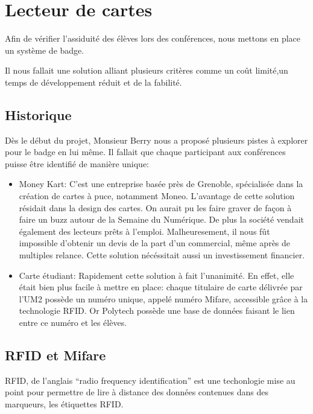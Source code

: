 \chapter{Lecteur de cartes}

Afin de vérifier l'assiduité des élèves lors des conférences, nous mettons en
place un système de badge.

Il nous fallait une solution alliant plusieurs critères comme un coût limité,un temps
de développement réduit et de la fabilité.

    \section{Historique}

Dès le début du projet, Monsieur Berry nous a proposé plusieurs pistes à 
explorer pour le badge en lui même. Il fallait que chaque participant aux
conférences puisse être identifié de manière unique:

\begin{itemize}
\item Money Kart: C'est une entreprise basée près de Grenoble, spécialisée
dans la création de cartes à puce, notamment Moneo. L'avantage de cette solution
résidait dans la design des cartes. On aurait pu les faire graver
de façon à faire un buzz autour de la Semaine du Numérique. De plus la société
vendait également des lecteurs prêts à l'emploi.
Malheuresement, il nous fût impossible d'obtenir un devis de la part d'un
commercial, même après de multiples relance. Cette solution nécéssitait aussi
un investissement financier.

\item Carte étudiant: Rapidement cette solution à fait l'unanimité. En effet,
elle était bien plus facile à mettre en place: chaque titulaire de carte délivrée
par l'UM2 possède un numéro unique, appelé numéro Mifare, accessible grâce à
la technologie RFID. Or Polytech possède une base de données faisant le lien entre
ce numéro et les élèves.
\end{itemize}

    \section{RFID et Mifare}

RFID, de l'anglais ``radio frequency identification'' est une techonlogie 
mise au point pour permettre de lire à distance des données contenues dans des
marqueurs, les étiquettes RFID.

